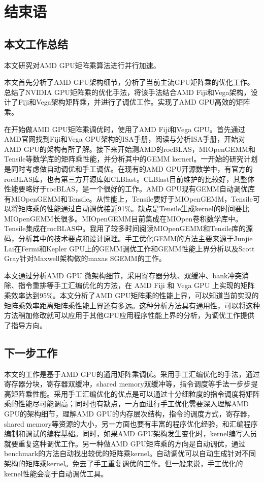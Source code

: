\chapter{结束语}\label{chap:Conclusion}

\section{本文工作总结}
本文研究对AMD GPU矩阵乘算法进行并行加速。 

本文首先分析了AMD GPU架构细节，分析了当前主流GPU矩阵乘的优化工作。总结了NVIDIA GPU矩阵乘的优化手法，将该手法结合AMD Fiji和Vega架构，设计了Fiji和Vega架构矩阵乘，并进行了调优工作。实现了AMD GPU高效的矩阵乘。

在开始做AMD GPU矩阵乘调优时，使用了AMD Fiji和Vega GPU。首先通过AMD官网找到Fiji和Vega GPU架构的ISA手册，阅读与分析ISA手册，开始对AMD GPU的架构有所了解。接下来开始测AMD的rocBLAS，MIOpenGEMM和Tensile等数学库的矩阵乘性能，并分析其中的GEMM kernerl。一开始的研究计划是同时考虑做自动调优和手工调优。在现有的AMD GPU开源数学中，有官方的rocBLAS库，也有第三方开源库如CLBlast。CLBlast目前维护的比较好，其整体性能要略好于rocBLAS，是一个很好的工作。AMD GPU现有GEMM自动调优库有MIOpenGEMM和Tensile。从性能上，Tensile要好于MIOpenGEMM，Tensile可以将矩阵乘的性能通过自动调优接近91\%。缺点是Tensile生成kernel的时间要比MIOpenGEMM长很多。MIOpenGEMM目前集成在MIOpen卷积数学库中。Tensile集成在rocBLAS中。我用了较多时间阅读MIOpenGEMM和Tensile库的源码，分析其中的技术要点和设计原理。手工优化GEMM的方法主要来源于Junjie Lai在Fermi和Kepler GPU上的GEMM调优工作和GEMM性能上界分析以及Scott Gray针对Maxwell架构做的maxas SGEMM的工作。

本文通过分析AMD GPU 微架构细节，采用寄存器分块、双缓冲、bank冲突消除、指令重排等手工汇编优化的方法，在 AMD Fiji 和 Vega GPU 上实现的矩阵乘效率达到95\%。本文分析了AMD GPU矩阵乘的性能上界，可以知道当前实现的矩阵乘效率距离矩阵乘性能上界还有多远。这种分析方法具有通用性，可以将这种方法稍加修改就可以应用于其他GPU应用程序性能上界的分析，为调优工作提供了指导方向。

\section{下一步工作}
本文的工作是基于AMD GPU的通用矩阵乘调优。采用手工汇编优化的手法，通过寄存器分块，寄存器双缓冲，shared memory双缓冲等，指令调度等手法一步步提高矩阵乘性能。采用手工汇编优化的优点是可以通过十分细粒度的指令调度将矩阵乘的性能尽可能调高；同时也有缺点，一方面进行手工优化需要深入理解AMD GPU的架构细节，理解AMD GPU的内存层次结构，指令的调度方式，寄存器，shared memory等资源的大小，另一方面也要有丰富的程序优化经验，和汇编程序编制和调试的编程基础。同时，如果AMD GPU架构发生变化时，kernel编写人员就要重复这种调优工作。另一种做AMD GPU矩阵乘的方向是自动调优，通过benchmark的方法自动找出较优的矩阵乘kernel。自动调优可以自动生成针对不同架构的矩阵乘kernel。免去了手工重复调优的工作。但一般来说，手工优化的kernel性能会高于自动调优工具。

